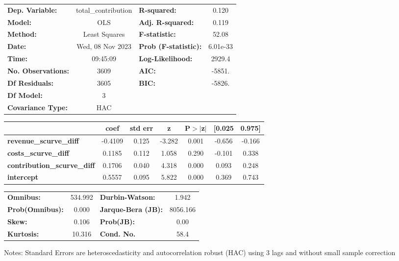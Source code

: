 \begin{center}
\begin{tabular}{lclc}
\toprule
\textbf{Dep. Variable:}             & total\_contribution & \textbf{  R-squared:         } &     0.120   \\
\textbf{Model:}                     &         OLS         & \textbf{  Adj. R-squared:    } &     0.119   \\
\textbf{Method:}                    &    Least Squares    & \textbf{  F-statistic:       } &     52.08   \\
\textbf{Date:}                      &   Wed, 08 Nov 2023  & \textbf{  Prob (F-statistic):} &  6.01e-33   \\
\textbf{Time:}                      &       09:45:09      & \textbf{  Log-Likelihood:    } &    2929.4   \\
\textbf{No. Observations:}          &          3609       & \textbf{  AIC:               } &    -5851.   \\
\textbf{Df Residuals:}              &          3605       & \textbf{  BIC:               } &    -5826.   \\
\textbf{Df Model:}                  &             3       & \textbf{                     } &             \\
\textbf{Covariance Type:}           &         HAC         & \textbf{                     } &             \\
\bottomrule
\end{tabular}
\begin{tabular}{lcccccc}
                                    & \textbf{coef} & \textbf{std err} & \textbf{z} & \textbf{P$> |$z$|$} & \textbf{[0.025} & \textbf{0.975]}  \\
\midrule
\textbf{revenue\_scurve\_diff}      &      -0.4109  &        0.125     &    -3.282  &         0.001        &       -0.656    &       -0.166     \\
\textbf{costs\_scurve\_diff}        &       0.1185  &        0.112     &     1.058  &         0.290        &       -0.101    &        0.338     \\
\textbf{contribution\_scurve\_diff} &       0.1706  &        0.040     &     4.318  &         0.000        &        0.093    &        0.248     \\
\textbf{intercept}                  &       0.5557  &        0.095     &     5.822  &         0.000        &        0.369    &        0.743     \\
\bottomrule
\end{tabular}
\begin{tabular}{lclc}
\textbf{Omnibus:}       & 534.992 & \textbf{  Durbin-Watson:     } &    1.942  \\
\textbf{Prob(Omnibus):} &   0.000 & \textbf{  Jarque-Bera (JB):  } & 8056.166  \\
\textbf{Skew:}          &   0.106 & \textbf{  Prob(JB):          } &     0.00  \\
\textbf{Kurtosis:}      &  10.316 & \textbf{  Cond. No.          } &     58.4  \\
\bottomrule
\end{tabular}
\end{center}

Notes: \newline
 [1] Standard Errors are heteroscedasticity and autocorrelation robust (HAC) using 3 lags and without small sample correction